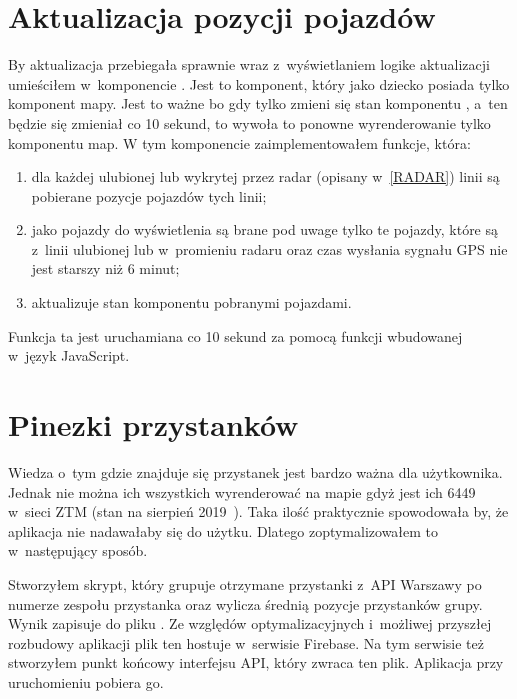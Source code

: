 \documentclass{SGGW-thesis}
\begin{document}
\section{Aktualizacja pozycji pojazdów}
By aktualizacja przebiegała sprawnie wraz z~wyświetlaniem logike aktualizacji umieściłem w~komponencie .
Jest to komponent, który jako dziecko posiada tylko komponent mapy.
Jest to ważne bo gdy tylko zmieni się stan komponentu , a~ten będzie się zmieniał co 10 sekund, to wywoła to ponowne wyrenderowanie tylko komponentu map.
W tym komponencie zaimplementowałem funkcje, która:
\begin{enumerate}
  \item{dla każdej ulubionej lub wykrytej przez radar (opisany w~\ref{RADAR}) linii są pobierane pozycje pojazdów tych linii;}
  \item{jako pojazdy do wyświetlenia są brane pod uwage tylko te pojazdy, które są z~linii ulubionej lub w~promieniu radaru oraz czas wysłania sygnału GPS nie jest starszy niż 6 minut;}
  \item{aktualizuje stan komponentu  pobranymi pojazdami.}
\end{enumerate}
Funkcja ta jest uruchamiana co 10 sekund za pomocą funkcji  wbudowanej w~język JavaScript.

\section{Pinezki przystanków}
Wiedza o~tym gdzie znajduje się przystanek jest bardzo ważna dla użytkownika.
Jednak nie można ich wszystkich wyrenderować na mapie gdyż jest ich 6449 w~sieci ZTM (stan na sierpień 2019~\cite{ZTMSTATS}).
Taka ilość praktycznie spowodowała by, że aplikacja nie nadawałaby się do użytku.
Dlatego zoptymalizowałem to w~następujący sposób.

\label{FIREBASE}
Stworzyłem skrypt, który grupuje otrzymane przystanki z~API Warszawy po numerze zespołu przystanka oraz wylicza średnią pozycje przystanków grupy.
Wynik zapisuje do pliku .
Ze względów optymalizacyjnych i~możliwej przyszłej rozbudowy aplikacji plik ten hostuje w~serwisie Firebase.
Na tym serwisie też stworzyłem punkt końcowy interfejsu API, który zwraca ten plik.
Aplikacja przy uruchomieniu pobiera go.
\end{document}
